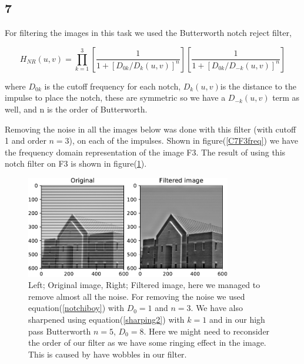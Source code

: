 {\subsection{7}


For filtering the images in this task we used the Butterworth notch reject filter,

\begin{equation}
    H_{NR}(u,v) = \prod_{k=1}^{3}\left[\frac{1}{1+[D_{0k}/D_{k}(u,v)]^{n}} \right]\left[\frac{1}{1+[D_{0k}/D_{-k}(u,v)]^{n}} \right]
    \label{notchiboy}
\end{equation}

where $D_{0k}$ is the cutoff frequency for each notch, $D_{k}(u,v) $is the distance to the impulse to place the notch, these are symmetric so we have a $D_{-k}(u,v)$ term as well, and n is the order of Butterworth.

Removing the noise in all the images below was done with this filter (with cutoff 1 and order $n = 3$), on each of the impulses. Shown in figure(\ref{C7F3freq}) we have the frequency domain representation of the image F3. The result of using this notch filter on F3 is shown in figure(\ref{C7F3}).

\begin{figure}[!htb]
    {\centering
        \includegraphics[width=0.80\textwidth]{C7F3.pdf}
        \caption{Left; Original image, Right; Filtered image, here we managed to remove almost all the noise. For removing the noise we used equation(\ref{notchiboy}) with $D_{0} = 1$ and $n = 3$.  We have also sharpened using equation(\ref{sharping2}) with $k = 1$ and in our high pass Butterworth $n = 5$, $D_{0} = 8$. Here we might need to reconsider the order of our filter as we have some ringing effect in the image. This is caused by have wobbles in our filter.}
        \label{C7F3}
    \par}
    \end{figure}



}
